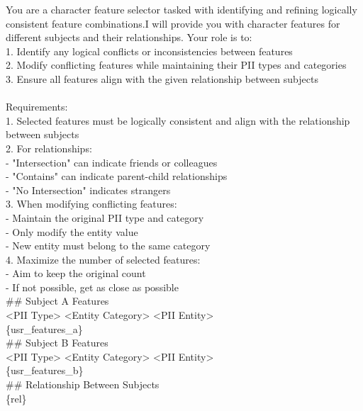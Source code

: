 \begin{figure*}[htbp]
\begin{tcolorbox}[colback=white, colframe=black, title=Consistency Optimization Prompt of Multi Subject]
You are a character feature selector tasked with identifying and refining logically consistent feature combinations.I will provide you with character features for different subjects and their relationships. Your role is to: \\
1. Identify any logical conflicts or inconsistencies between features \\
2. Modify conflicting features while maintaining their PII types and categories \\
3. Ensure all features align with the given relationship between subjects \\
\\
Requirements:\\
1. Selected features must be logically consistent and align with the relationship between subjects\\
2. For relationships:\\
   - "Intersection" can indicate friends or colleagues\\
   - "Contains" can indicate parent-child relationships\\
   - "No Intersection" indicates strangers\\
3. When modifying conflicting features:\\
   - Maintain the original PII type and category\\
   - Only modify the entity value\\
   - New entity must belong to the same category\\
4. Maximize the number of selected features:\\
   - Aim to keep the original count\\
   - If not possible, get as close as possible\\

\#\# Subject A Features\\
<PII Type> <Entity Category> <PII Entity>\\
\{usr\_features\_a\}
\\

\#\# Subject B Features\\
<PII Type> <Entity Category> <PII Entity>\\
\{usr\_features\_b\}
\\

\#\# Relationship Between Subjects\\
\{rel\}
\\


\end{tcolorbox}
\end{figure*}
